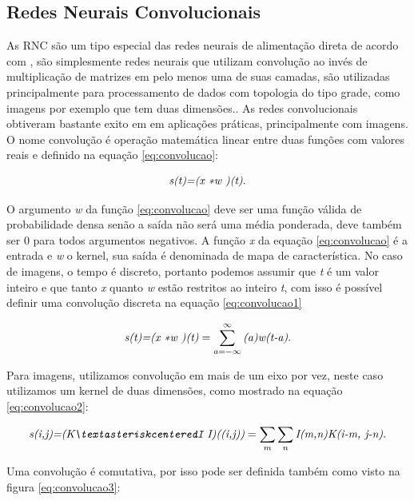 \documentclass[
	12pt,				%
    oneside,			%
	a4paper,			%
	english,			%
	french,				%
	spanish,			%
	brazil,				%
	]{abntex2}
\begin{document}
\subsection{Redes Neurais Convolucionais}
As RNC são um tipo especial das redes neurais de alimentação direta de acordo com  , são simplesmente redes neurais que utilizam convolução ao invés de multiplicação de matrizes em pelo menos uma de suas camadas, são utilizadas principalmente para processamento de dados com topologia do tipo grade, como imagens por exemplo que tem duas dimensões.. As redes convolucionais obtiveram bastante exito em em aplicações práticas, principalmente com imagens. 
O nome convolução é operação matemática linear entre duas funções com valores reais e definido na equação \ref{eq:convolucao}:

\begin{equation}
\centering
    \textit{s(t)=(x \textasteriskcentered w )(t)}.
    \label{eq:convolucao}
\end{equation}

O argumento \textit{w} da função \ref{eq:convolucao} deve ser uma função válida de probabilidade densa senão a saída não será uma média ponderada, deve também ser 0 para todos argumentos negativos. A função \textit{x} da equação \ref{eq:convolucao} é a entrada e \textit{w} o kernel, sua saída é denominada de mapa de característica. No caso de imagens, o tempo é discreto, portanto podemos assumir que \textit{t} é um valor inteiro e que tanto \textit{x} quanto \textit{w} estão restritos ao inteiro \textit{t}, com isso é possível definir uma convolução discreta na equação \ref{eq:convolucao1}

\begin{equation}
\centering
    \textit{s(t)=(x \textasteriskcentered w )(t)} = \sum_{a=- \infty}^{\infty} \textit{(a)w(t-a)} .
    \label{eq:convolucao1}
\end{equation}

Para imagens, utilizamos convolução em mais de um eixo por vez, neste caso utilizamos um kernel de duas dimensões, como mostrado na equação \ref{eq:convolucao2}:


\begin{equation}
\centering
    \textit{s(i,j)=(K\textasteriskcenteredI I)((i,j))} = \sum_{m} \sum_{n} \textit{I(m,n)K(i-m, j-n)} .
    \label{eq:convolucao2}
\end{equation}

Uma convolução é comutativa, por isso pode ser definida também como visto na figura \ref{eq:convolucao3}:
\end{document}
